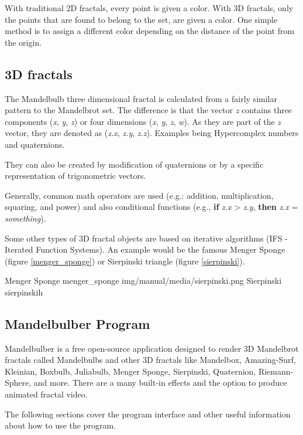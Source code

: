 With traditional 2D fractals, every point is given a color. With 3D fractals,
only the points that are found to belong to the set, are given a color.
One simple method is to assign a different color depending on the distance of the point from the origin.

\subsection{3D fractals}\label{d-fractals}

The Mandelbulb three dimensional fractal is calculated from a
fairly similar pattern to the Mandelbrot set. The difference is that the vector
\emph{z} contains three components (\emph{x}, \emph{y}, \emph{z}) or four
dimensions (\emph{x}, \emph{y}, \emph{z}, \emph{w}). As they are part of the
\emph{z} vector, they are denoted as (\emph{z.x}, \emph{z.y}, \emph{z.z}).
Examples being Hypercomplex numbers and quaternions.

They can also be created by modification of quaternions or by a specific
representation of trigonometric vectors. 

Generally, common math operators are
used (e.g.: addition, multiplication, squaring, and power) and also
conditional functions (e.g., \textbf{if} \emph{z.x} \textgreater{} \emph{z.y},
\textbf{then} \emph{z.x} = \emph{something}).

Some other types of 3D fractal objects are based on iterative algorithms (IFS -
Iterated Function Systems). An example would be the famous Menger Sponge (figure \ref{menger_sponge}) or Sierpinski triangle (figure \ref{sierpinski}).
\nopagebreak

{Menger Sponge}
{menger_sponge}
{img/manual/media/sierpinski.png}
{Sierpinski}
{sierpinski}{h}

\subsection{Mandelbulber Program}\label{mandelbulber-program}


Mandelbulber is a free open-source application designed to render 3D
Mandelbrot fractals called Mandelbulbs and other 3D fractals like
Mandelbox, Amazing-Surf, Kleinian, Boxbulb, Juliabulb, Menger Sponge, Sierpinski, Quaternion, Riemann-Sphere, and more. There are a many built-in effects and the option to produce animated fractal video.


The following sections
cover the program interface and other useful information about how to use the program.

